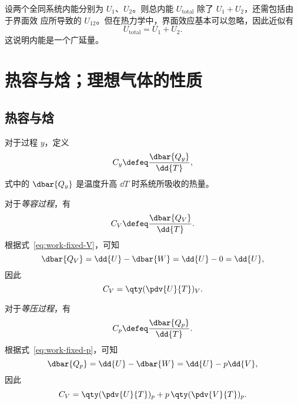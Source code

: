 设两个全同系统内能分别为 $U_1$、$U_2$。则总内能 $U_\text{total}$ 除了 $U_1+U_2$，还需包括由于界面效
应所导致的 $U_{12}$。但在热力学中，界面效应基本可以忽略，因此近似有
\begin{equation}
  U_\text{total} = U_1 + U_2.
\end{equation}
这说明内能是一个广延量。

\section{热容与焓；理想气体的性质} \label{sec:heat-capacity-enthalpy-ideal-gas}

\subsection{热容与焓} \label{subsec:heat-capacity-and-enthalpy}

对于过程 $y$，定义
\begin{equation}
  C_y \defeq \frac{\dbar{Q_y}}{\dd{T}},
\end{equation}
式中的 $\dbar{Q_y}$ 是温度升高 $\dd{T}$ 时系统所吸收的热量。

对于\emph{等容过程}，有
\begin{equation}
  C_V \defeq \frac{\dbar{Q_V}}{\dd{T}}.
\end{equation}
根据式~\eqref{eq:work-fixed-V}，可知
\begin{equation}
  \dbar{Q_V} = \dd{U} - \dbar{W} = \dd{U} - 0 = \dd{U},
\end{equation}
因此
\begin{equation} \label{eq:heat-capacity-fixed-V}
  C_V = \qty(\pdv{U}{T})_V.
\end{equation}

对于\emph{等压过程}，有
\begin{equation}
  C_p \defeq \frac{\dbar{Q_p}}{\dd{T}}.
\end{equation}
根据式~\eqref{eq:work-fixed-p}，可知
\begin{equation} \label{eq:dQ-fixed-p}
  \dbar{Q_p} = \dd{U} - \dbar{W} = \dd{U} - p \dd{V},
\end{equation}
因此
\begin{equation} \label{eq:heat-capacity-fixed-p}
  C_V = \qty(\pdv{U}{T})_p + p \, \qty(\pdv{V}{T})_p.
\end{equation}


